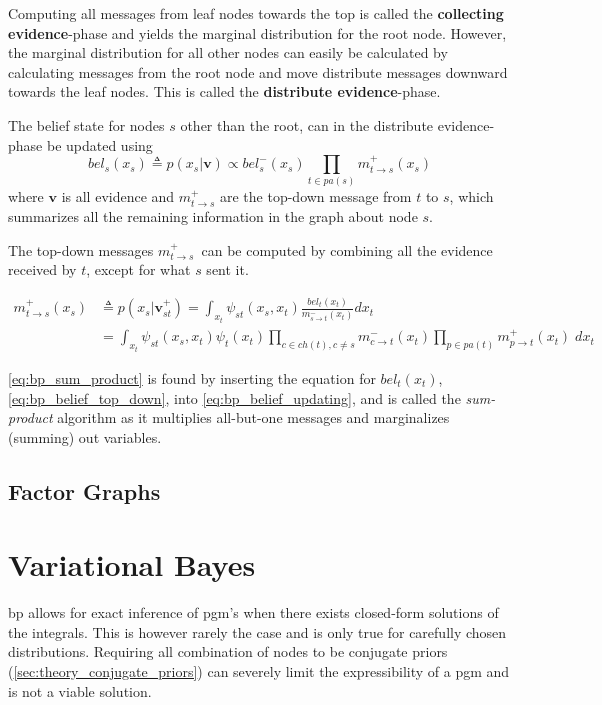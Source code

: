 Computing all messages from leaf nodes towards the top is called the \textbf{collecting evidence}-phase and yields the marginal distribution for the root node. However, the marginal distribution for all other nodes can easily be calculated by calculating messages from the root node and move distribute messages downward towards the leaf nodes. This is called the \textbf{distribute evidence}-phase. 

The belief state for nodes $s$ other than the root, can in the distribute evidence-phase be updated using
\begin{equation}\label{eq:bp_belief_top_down}
    bel_s(x_s) \triangleq p(x_s | \mathbf{v}) \propto bel_s^-(x_s) \prod_{t \in pa(s)} m_{t \to s}^+(x_s)
\end{equation}
where $\mathbf{v}$ is all evidence and $m_{t \to s}^+$ are the top-down message from $t$ to $s$, which summarizes all the remaining information in the graph about node $s$. 

The top-down messages $m_{t \to s}^+$ can be computed by combining all the evidence received by $t$, except for what $s$ sent it.

\begin{subequations}
\begin{align}
    m_{t \to s}^+(x_s) &\triangleq p(x_s | \mathbf{v}_{st}^+) = \int_{x_t}\psi_{st}(x_s, x_t)\frac{bel_t(x_t)}{m_{s \to t}^-(x_t)}dx_t \label{eq:bp_belief_updating}\\
    &= \int_{x_t} \psi_{st}(x_s, x_t)\psi_t(x_t) \prod_{c \in ch(t), c \neq s} m_{c \to t}^-(x_t) \prod_{p \in pa(t)} m_{p \to t}^+(x_t) \; dx_t\label{eq:bp_sum_product}
\end{align}
\end{subequations}

\cref{eq:bp_sum_product} is found by inserting the equation for $bel_t(x_t)$, \cref{eq:bp_belief_top_down}, into \cref{eq:bp_belief_updating}, and is called the \textit{sum-product} algorithm as it multiplies all-but-one messages and marginalizes (summing) out variables. 







\subsection{Factor Graphs}
\section{Variational Bayes}
\acrshort{bp} allows for exact inference of \acrshort{pgm}'s when there exists closed-form solutions of the integrals. This is however rarely the case and is only true for carefully chosen distributions. Requiring all combination of nodes to be conjugate priors (\cref{sec:theory_conjugate_priors}) can severely limit the expressibility of a \acrshort{pgm} and is not a viable solution. 

